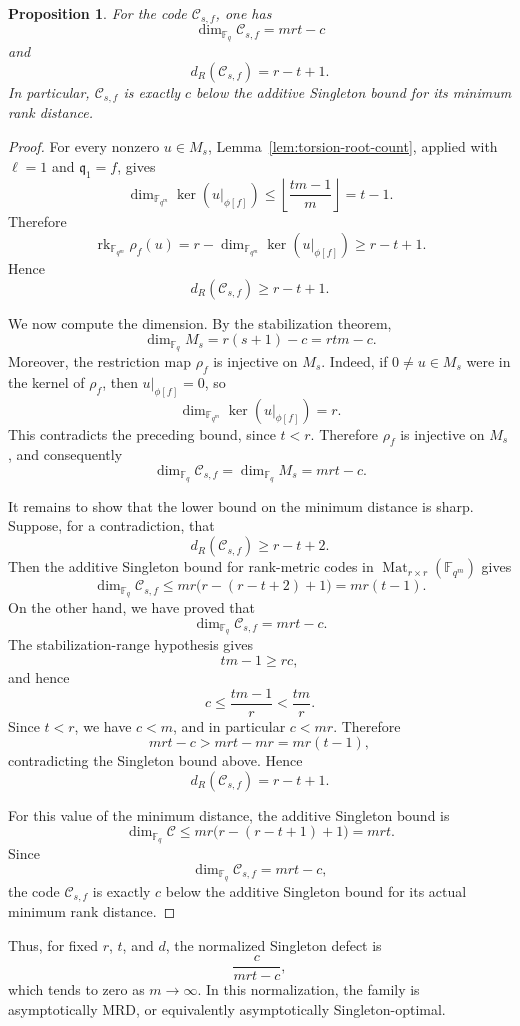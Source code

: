 \documentclass[10pt,a4paper]{amsart}
\DeclareMathOperator{\Mat}{Mat}
\DeclareMathOperator{\rk}{rk}
\theoremstyle{definition}
\theoremstyle{plain}
\newtheorem{proposition}[definition]{Proposition}
\theoremstyle{remark}
\newcommand{\vF}{\mathbb F}
\begin{document}
\begin{proposition}
For the code $\mathcal C_{s,f}$, one has
$$
\dim_{\vF_q}\mathcal C_{s,f}=mrt-c
$$
and
$$
d_R(\mathcal C_{s,f})=r-t+1.
$$
In particular, $\mathcal C_{s,f}$ is exactly $c$ below the additive Singleton bound for its minimum rank distance.
\end{proposition}

\begin{proof}
For every nonzero $u\in M_s$, Lemma~\ref{lem:torsion-root-count}, applied
with $\ell=1$ and $\mathfrak q_1=f$, gives
$$
\dim_{\vF_{q^m}}\ker\left(u|_{\phi[f]}\right)
\leq
\left\lfloor\frac{tm-1}{m}\right\rfloor
=t-1.
$$
Therefore
$$
\rk_{\vF_{q^m}}\rho_f(u)
=
r-\dim_{\vF_{q^m}}\ker\left(u|_{\phi[f]}\right)
\geq r-t+1.
$$
Hence
$$
d_R(\mathcal C_{s,f})\geq r-t+1.
$$

We now compute the dimension. By the stabilization theorem,
$$
\dim_{\vF_q}M_s
=
r(s+1)-c
=
rtm-c.
$$
Moreover, the restriction map $\rho_f$ is injective on $M_s$. Indeed, if $0\neq u\in M_s$ were in the kernel of $\rho_f$, then $u|_{\phi[f]}=0$, so
$$
\dim_{\vF_{q^m}}\ker\left(u|_{\phi[f]}\right)=r.
$$
This contradicts the preceding bound, since $t<r$. Therefore $\rho_f$ is injective on $M_s$, and consequently
$$
\dim_{\vF_q}\mathcal C_{s,f}
=
\dim_{\vF_q}M_s
=
mrt-c.
$$

It remains to show that the lower bound on the minimum distance is sharp. Suppose, for a contradiction, that
$$
d_R(\mathcal C_{s,f})\geq r-t+2.
$$
Then the additive Singleton bound for rank-metric codes in $\Mat_{r\times r}(\vF_{q^m})$ gives
$$
\dim_{\vF_q}\mathcal C_{s,f}
\leq
mr\bigl(r-(r-t+2)+1\bigr)
=
mr(t-1).
$$
On the other hand, we have proved that
$$
\dim_{\vF_q}\mathcal C_{s,f}=mrt-c.
$$
The stabilization-range hypothesis gives
$$
tm-1\geq rc,
$$
and hence
$$
c\leq \frac{tm-1}{r}<\frac{tm}{r}.
$$
Since $t<r$, we have $c<m$, and in particular $c<mr$. Therefore
$$
mrt-c>mrt-mr=mr(t-1),
$$
contradicting the Singleton bound above. Hence
$$
d_R(\mathcal C_{s,f})=r-t+1.
$$

For this value of the minimum distance, the additive Singleton bound is
$$
\dim_{\vF_q}\mathcal C\leq mr\bigl(r-(r-t+1)+1\bigr)=mrt.
$$
Since
$$
\dim_{\vF_q}\mathcal C_{s,f}=mrt-c,
$$
the code $\mathcal C_{s,f}$ is exactly $c$ below the additive Singleton bound for its actual minimum rank distance.
\end{proof}

Thus, for fixed $r$, $t$, and $d$, the normalized Singleton defect is
$$
\frac{c}{mrt-c},
$$
which tends to zero as $m\to\infty$. In this normalization, the family is
asymptotically MRD, or equivalently asymptotically Singleton-optimal.
\end{document}
